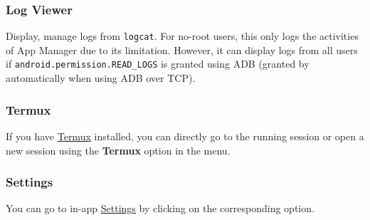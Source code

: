 \subsubsection{Log Viewer}\label{subsubsec:log-viewer} %
Display, manage logs from \texttt{logcat}.
For no-root users, this only logs the activities of App Manager due to its limitation.
However, it can display logs from all users if \texttt{android.permission.READ\_LOGS} is granted using ADB (granted by
automatically when using ADB over TCP).

\subsubsection{Termux} %
If you have \href{https://github.com/termux/termux-app}{Termux} installed, you can directly go to the running session
or open a new session using the \textbf{Termux} option in the menu.

\subsubsection{Settings} %
You can go to in-app \hyperref[sec:settings-page]{Settings} by clicking on the corresponding option.
